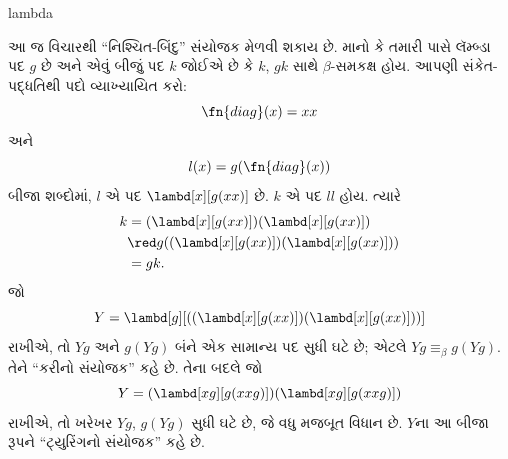 \documentclass[../../../include/open-logic-section]{subfiles}
\begin{document}
\begin{tagblock}{lambda}
\begin{digress}
આ જ વિચારથી ``નિશ્ચિત-બિંદુ'' સંયોજક મેળવી શકાય છે.
માનો કે તમારી પાસે લૅમ્બ્ડા પદ $g$ છે અને એવું બીજું
પદ $k$ જોઈએ છે કે $k$, $gk$ સાથે $\beta$-સમકક્ષ હોય.
આપણી સંકેત-પદ્ધતિથી પદો વ્યાખ્યાયિત કરો:
\[
\fn{diag}(x) = xx
\]
અને
\[
l(x) = g(\fn{diag}(x))
\]
બીજા શબ્દોમાં, $l$ એ પદ $\lambd[x][g(xx)]$ છે. $k$
એ પદ $ll$ હોય. ત્યારે
\begin{align*}
k & = (\lambd[x][g(xx)])(\lambd[x][g(xx)]) \\
& \red  g((\lambd[x][g(xx)])(\lambd[x][g(xx)])) \\
& = gk.
\end{align*}
જો
\[
Y = \lambd[g][((\lambd[x][g(xx)])(\lambd[x][g(xx)]))]
\]
રાખીએ, તો $Yg$ અને $g(Yg)$ બંને એક સામાન્ય પદ સુધી
ઘટે છે; એટલે $Yg \equiv_\beta
g(Yg)$. તેને ``કરીનો સંયોજક'' કહે છે. તેના બદલે જો
\[
Y = (\lambd[xg][g(xxg)])(\lambd[xg][g(xxg)])
\]
રાખીએ, તો ખરેખર $Yg$, $g(Yg)$ સુધી ઘટે છે, જે વધુ
મજબૂત વિધાન છે. $Y$ના આ બીજા રૂપને ``ટ્યુરિંગનો
સંયોજક'' કહે છે.
\end{digress}
\end{tagblock}
\end{document}
